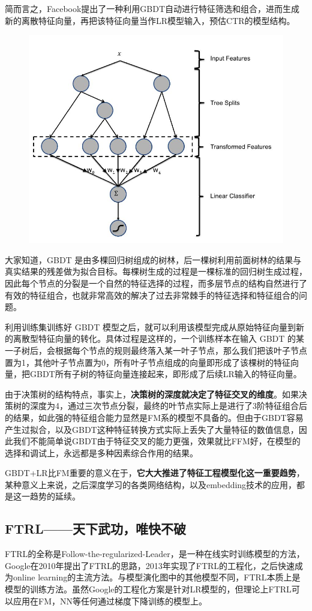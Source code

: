 \documentclass[12pt]{article}
\begin{document}
简而言之，Facebook提出了一种利用GBDT自动进行特征筛选和组合，进而生成新的离散特征向量，再把该特征向量当作LR模型输入，预估CTR的模型结构。
\begin{figure}[H]
    \centering
    \includegraphics[width=.6\textwidth]{fig/Facebook_GBDT_LR_Feature.jpg}
\end{figure}

大家知道，GBDT 是由多棵回归树组成的树林，后一棵树利用前面树林的结果与真实结果的残差做为拟合目标。每棵树生成的过程是一棵标准的回归树生成过程，因此每个节点的分裂是一个自然的特征选择的过程，而多层节点的结构自然进行了有效的特征组合，也就非常高效的解决了过去非常棘手的特征选择和特征组合的问题。

利用训练集训练好 GBDT 模型之后，就可以利用该模型完成从原始特征向量到新的离散型特征向量的转化。具体过程是这样的，一个训练样本在输入 GBDT 的某一子树后，会根据每个节点的规则最终落入某一叶子节点，那么我们把该叶子节点置为1，其他叶子节点置为0，所有叶子节点组成的向量即形成了该棵树的特征向量，把GBDT所有子树的特征向量连接起来，即形成了后续LR输入的特征向量。

由于决策树的结构特点，事实上，\textbf{决策树的深度就决定了特征交叉的维度}。如果决策树的深度为4，通过三次节点分裂，最终的叶节点实际上是进行了3阶特征组合后的结果，如此强的特征组合能力显然是FM系的模型不具备的。但由于GBDT容易产生过拟合，以及GBDT这种特征转换方式实际上丢失了大量特征的数值信息，因此我们不能简单说GBDT由于特征交叉的能力更强，效果就比FFM好，在模型的选择和调试上，永远都是多种因素综合作用的结果。

GBDT+LR比FM重要的意义在于，\textbf{它大大推进了特征工程模型化这一重要趋势}，某种意义上来说，之后深度学习的各类网络结构，以及embedding技术的应用，都是这一趋势的延续。

\subsection{FTRL——天下武功，唯快不破}
FTRL的全称是Follow-the-regularized-Leader，是一种在线实时训练模型的方法，Google在2010年提出了FTRL的思路，2013年实现了FTRL的工程化，之后快速成为online learning的主流方法。与模型演化图中的其他模型不同，FTRL本质上是模型的训练方法。虽然Google的工程化方案是针对LR模型的，但理论上FTRL可以应用在FM，NN等任何通过梯度下降训练的模型上。
\end{document}
